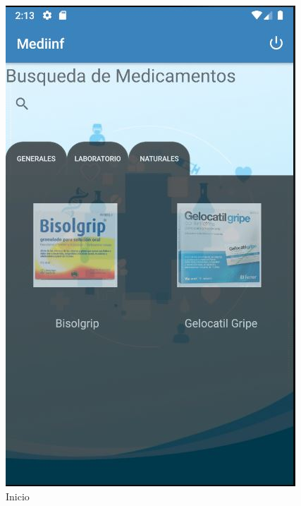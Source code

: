 \begin{figure}[H]
\begin{minipage}[b]{0.55\linewidth}
		\includegraphics[width=\linewidth]{img/movil3}
		\caption{Inicio}
		\label{fig:figura4}
	\end{minipage}
\end{figure}


